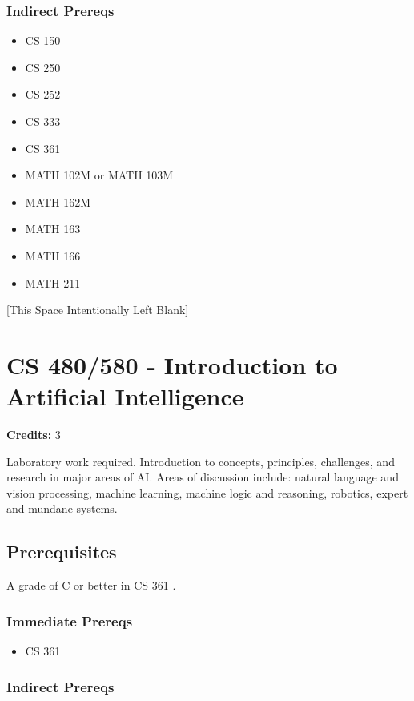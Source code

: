 \documentclass[]{article}
\providecommand{\tightlist}{%
  \setlength{\itemsep}{0pt}\setlength{\parskip}{0pt}}
\newcommand{\pagebreakhere}{
\vspace*{\fill}
\begin{center}
[This Space Intentionally Left Blank]
\end{center}
\vspace*{\fill}
\newpage
}
\begin{document}
\subsubsection{Indirect Prereqs}\label{indirect-prereqs-38}

\begin{itemize}
\tightlist
\item
  CS 150
\item
  CS 250
\item
  CS 252
\item
  CS 333
\item
  CS 361
\item
  MATH 102M or MATH 103M
\item
  MATH 162M
\item
  MATH 163
\item
  MATH 166
\item
  MATH 211
\end{itemize}

\pagebreakhere
\section{CS 480/580 - Introduction to Artificial
Intelligence}\label{cs-480580---introduction-to-artificial-intelligence}

\textbf{Credits:} 3

Laboratory work required. Introduction to concepts, principles,
challenges, and research in major areas of AI. Areas of discussion
include: natural language and vision processing, machine learning,
machine logic and reasoning, robotics, expert and mundane systems.

\subsection{Prerequisites}\label{prerequisites-48}

A grade of C or better in CS 361 .

\subsubsection{Immediate Prereqs}\label{immediate-prereqs-39}

\begin{itemize}
\tightlist
\item
  CS 361
\end{itemize}

\subsubsection{Indirect Prereqs}\label{indirect-prereqs-39}
\end{document}
